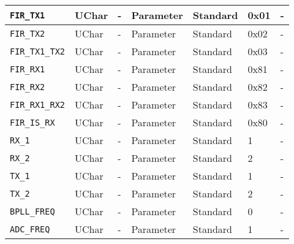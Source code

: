 \documentclass{article}
\begin{document}
\begin{landscape}
\begin{scriptsize}
\begin{longtable}{|p{3.6cm}|p{8.1cm}|p{1.4cm}|p{1.3cm}|p{1.4cm}|p{2.5cm}|p{3.6cm}|}
			\hline
      \verb+FIR_TX1+                   & UChar        & -               & Parameter             & Standard                         & 0x01                & - \\
			\hline
      \verb+FIR_TX2+                   & UChar        & -               & Parameter             & Standard                         & 0x02                & - \\
			\hline
      \verb+FIR_TX1_TX2+               & UChar        & -               & Parameter             & Standard                         & 0x03                & - \\
			\hline
      \verb+FIR_RX1+                   & UChar        & -               & Parameter             & Standard                         & 0x81                & - \\
			\hline
      \verb+FIR_RX2+                   & UChar        & -               & Parameter             & Standard                         & 0x82                & - \\
			\hline
      \verb+FIR_RX1_RX2+               & UChar        & -               & Parameter             & Standard                         & 0x83                & - \\
			\hline
      \verb+FIR_IS_RX+                 & UChar        & -               & Parameter             & Standard                         & 0x80                & - \\
			\hline
      \verb+RX_1+                      & UChar        & -               & Parameter             & Standard                         & 1                   & - \\
			\hline
      \verb+RX_2+                      & UChar        & -               & Parameter             & Standard                         & 2                   & - \\
			\hline
      \verb+TX_1+                      & UChar        & -               & Parameter             & Standard                         & 1                   & - \\
			\hline
      \verb+TX_2+                      & UChar        & -               & Parameter             & Standard                         & 2                   & - \\
			\hline
      \verb+BPLL_FREQ+                 & UChar        & -               & Parameter             & Standard                         & 0                   & - \\
			\hline
      \verb+ADC_FREQ+                  & UChar        & -               & Parameter             & Standard                         & 1                   & - \\

\end{longtable}
\end{scriptsize}
\end{landscape}
\end{document}
